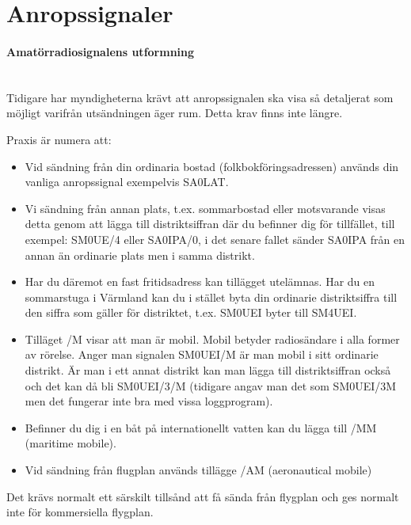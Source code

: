 \newpage

\section{Anropssignaler}

\paragraph{Amatörradiosignalens utformning} \hfill \\

Tidigare har myndigheterna krävt att anropssignalen ska visa så
detaljerat som möjligt varifrån utsändningen äger rum. Detta krav
finns inte längre.

Praxis är numera att:

\begin{itemize}
\item Vid sändning från din ordinaria bostad
  (folkbokföringsadressen) används din vanliga anropssignal
  exempelvis SA0LAT.
\item Vi sändning från annan plats, t.ex. sommarbostad eller
  motsvarande visas detta genom att lägga till distriktsiffran där
  du befinner dig för tillfället, till exempel: SM0UE/4 eller SA0IPA/0, i det
  senare fallet sänder SA0IPA från en annan än ordinarie plats men
  i samma distrikt.
\item Har du däremot en fast fritidsadress kan tillägget
  utelämnas. Har du en sommarstuga i Värmland kan du i stället
  byta din ordinarie distriktsiffra till den siffra som gäller
  för distriktet, t.ex. SM0UEI byter till SM4UEI.
\item Tilläget /M visar att man är mobil. Mobil betyder
  radiosändare i alla former av rörelse. Anger man signalen
  SM0UEI/M är man mobil i sitt ordinarie distrikt. Är man i
  ett annat distrikt kan man lägga till distriktsiffran också
  och det kan då bli SM0UEI/3/M (tidigare angav man det som
  SM0UEI/3M men det fungerar inte bra med vissa loggprogram).
  
\item Befinner du dig i en båt på internationellt vatten kan
  du lägga till /MM (maritime mobile).
\item Vid sändning från flugplan används tillägge /AM
  (aeronautical mobile)
\end{itemize}

Det krävs normalt ett särskilt tillsånd att få sända från flygplan och
ges normalt inte för kommersiella flygplan.


